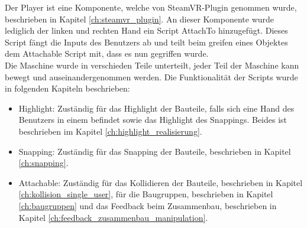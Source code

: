 Der \grqq Player\grqq{} ist eine Komponente, welche von SteamVR-Plugin genommen wurde, beschrieben in Kapitel \ref{ch:steamvr_plugin}. An dieser Komponente wurde lediglich der linken und rechten Hand ein Script \grqq AttachTo\grqq{} hinzugefügt. Dieses Script fängt die Inputs des Benutzers ab und teilt beim greifen eines Objektes dem \grqq Attachable\grqq{} Script mit, dass es nun gegriffen wurde. \\

\noindent Die Maschine wurde in verschieden Teile unterteilt, jeder Teil der Maschine kann bewegt und auseinandergenommen werden. Die Funktionalität der Scripts wurde in folgenden Kapiteln beschrieben:

\begin{itemize} [itemsep=1pt,topsep=0pt]	
	\item Highlight: Zuständig für das Highlight der Bauteile, falls sich eine Hand des Benutzers in einem befindet sowie das Highlight des Snappings. Beides ist beschrieben im Kapitel \ref{ch:highlight_realisierung}.
	
	\item Snapping: Zuständig für das Snapping der Bauteile, beschrieben in Kapitel \ref{ch:snapping}.
	
	\item Attachable: Zuständig für das Kollidieren der Bauteile, beschrieben in Kapitel \ref{ch:kollision_single_user}, für die Baugruppen, beschrieben in Kapitel \ref{ch:baugruppen} und das Feedback beim Zusammenbau, beschrieben in Kapitel \ref{ch:feedback_zusammenbau_manipulation}.
\end{itemize}